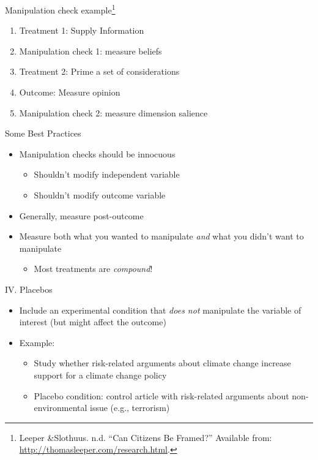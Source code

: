 \documentclass[
  ignorenonframetext,
]{beamer}
\begin{document}
\begin{frame}{\normalsize Manipulation check
example\footnote{Leeper \&Slothuus. n.d. ``Can Citizens Be Framed?'' Available from: \url{http://thomasleeper.com/research.html}.}}
\protect\hypertarget{manipulation-check-example}{}
\begin{enumerate}
\item Treatment 1: Supply Information
\item Manipulation check 1: measure beliefs
\item Treatment 2: Prime a set of considerations
\item Outcome: Measure opinion
\item Manipulation check 2: measure dimension salience
\end{enumerate}
\end{frame}

\begin{frame}{Some Best Practices}
\protect\hypertarget{some-best-practices}{}
\begin{itemize}\itemsep0.5em
\item<2-> Manipulation checks should be innocuous
    \begin{itemize}
    \item Shouldn't modify independent variable
    \item Shouldn't modify outcome variable
    \end{itemize}
\item<3-> Generally, measure post-outcome
\item<4-> Measure both what you wanted to manipulate \textit{and} what you didn't want to manipulate
    \begin{itemize}
    \item Most treatments are \textit{compound}!
    \end{itemize}
\end{itemize}
\end{frame}

\begin{frame}{IV. Placebos}
\protect\hypertarget{iv.-placebos}{}
\begin{itemize}\itemsep0.5em
\item Include an experimental condition that \textit{does not} manipulate the variable of interest (but might affect the outcome)
\item<2-> Example:
    \begin{itemize}
    \item Study whether risk-related arguments about climate change increase support for a climate change policy
    \item Placebo condition: control article with risk-related arguments about non-environmental issue (e.g., terrorism)
    \end{itemize}
\end{itemize}
\end{frame}
\end{document}
